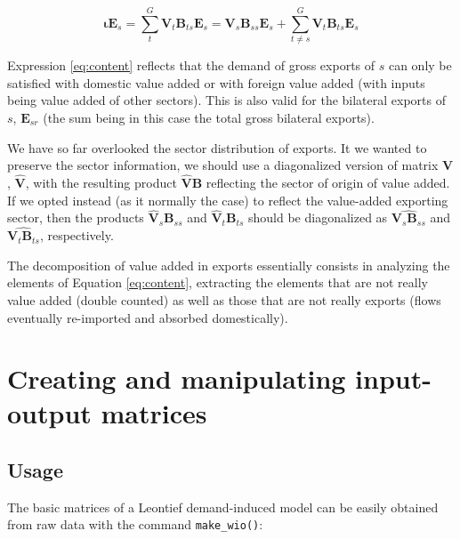 \begin{equation} 
    \boldsymbol{\iota} \mathbf{E}_{s}
    = \sum_{t}^{G} {{\mathbf{V}}_t\mathbf{B}_{ts}\mathbf{E}_{s}}
    = {\mathbf{V}}_s \mathbf{B}_{ss} \mathbf{E}_{s} +
    \sum_{t\neq s}^{G}{{\mathbf{V}}_t \mathbf{B}_{ts} \mathbf{E}_{s}}
    \label{eq:content}
\end{equation}

Expression \eqref{eq:content} reflects that the demand of gross exports of \(s\)
can only be satisfied with domestic value added or with foreign value added
(with inputs being value added of other sectors). This is also valid for the
bilateral exports of \(s\), \(\mathbf{E}_{sr}\) (the sum being in this case the
total gross bilateral exports).

We have so far overlooked the sector distribution of exports. It we wanted to
preserve the sector information, we should use a diagonalized version of matrix
\(\mathbf{V}\), \(\hat{\mathbf{V}}\), with the resulting product \(\hat{\mathbf{V}} \mathbf{B}\) reflecting the sector of origin of value added. If we opted instead
(as it normally the case) to reflect the value-added exporting sector, then the
products \({\hat{\mathbf{V}}}_s \mathbf{B}_{ss}\) and \({\hat{\mathbf{V}}}_t \mathbf{B}_{ts}\) should be diagonalized as \(\widehat{{\mathbf{V}}_s \mathbf{B}_{ss}}\) and \(\widehat{{\mathbf{V}}_t \mathbf{B}_{ts}}\), respectively.

The decomposition of value added in exports essentially consists in
analyzing the elements of Equation \eqref{eq:content}, extracting the elements
that are not really value added (double counted) as well as those that are
not really exports (flows eventually re-imported and absorbed domestically).

\hypertarget{creating-and-manipulating-input-output-matrices}{%
\section{Creating and manipulating input-output matrices}\label{creating-and-manipulating-input-output-matrices}}

\hypertarget{usage}{%
\subsection{Usage}\label{usage}}

The basic matrices of a Leontief demand-induced model can be easily obtained
from raw data with the command \texttt{make\_wio()}:


